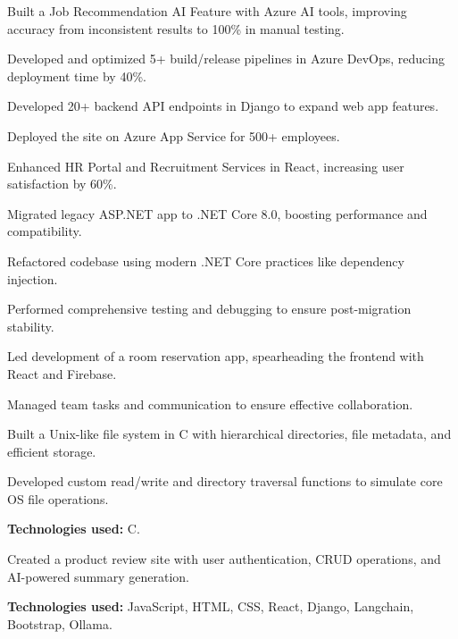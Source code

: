 \documentclass{resume}
\begin{document}
\begin{resume}
	\begin{experiences}
		{
			\item Built a Job Recommendation AI Feature with Azure AI tools, improving accuracy from inconsistent results to 100\% in manual testing.
			\item Developed and optimized 5+ build/release pipelines in Azure DevOps, reducing deployment time by 40\%.
			\item Developed 20+ backend API endpoints in Django to expand web app features.
			\item Deployed the site on Azure App Service for 500+ employees.
			\item Enhanced HR Portal and Recruitment Services in React, increasing user satisfaction by 60\%.
		}
		{
			\item Migrated legacy ASP.NET app to .NET Core 8.0, boosting performance and compatibility.
			\item Refactored codebase using modern .NET Core practices like dependency injection.
			\item Performed comprehensive testing and debugging to ensure post-migration stability.
		}
		{
			\item Led development of a room reservation app, spearheading the frontend with React and Firebase.
			\item Managed team tasks and communication to ensure effective collaboration.
		}
	\end{experiences}

	\begin{projects}
		{ \item Built a Unix-like file system in C with hierarchical directories, file metadata, and efficient storage.
			\item Developed custom read/write and directory traversal functions to simulate core OS file operations.
			\item \textbf{Technologies used:} C.
		}
		{
			\item Created a product review site with user authentication, CRUD operations, and AI-powered summary generation.
			\item \textbf{Technologies used:} JavaScript, HTML, CSS, React, Django, Langchain, Bootstrap, Ollama.
		}
	\end{projects}

\end{resume}
\end{document}
